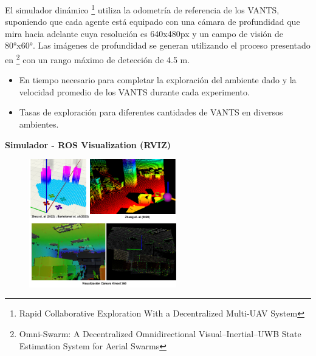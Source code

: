 \documentclass[
  24pt, %
  aspectratio=169, %
]{beamer}
\begin{document}
\begin{frame}
  El simulador dinámico \cite{RACER2022} \footnote{Rapid Collaborative Exploration With a Decentralized Multi-UAV System} utiliza la odometría de referencia de los VANTS, suponiendo que cada agente está equipado con una cámara de profundidad que mira hacia adelante cuya resolución es 640x480px y un campo de visión de 80°x60°. Las imágenes de profundidad se generan utilizando el proceso presentado en \cite{OMNI2022} \footnote{Omni-Swarm: A Decentralized Omnidirectional Visual–Inertial–UWB State Estimation System for Aerial Swarms} con un rango máximo de detección de 4.5 m.
  \bigskip %
  \begin{itemize}
  \item En tiempo necesario para completar la exploración del ambiente dado y la velocidad promedio de los VANTS durante cada experimento.
  \item Tasas de exploración para diferentes cantidades de VANTS en diversos ambientes.
  \end{itemize}
\end{frame}

\begin{frame}
  \textbf{Simulador -  ROS Visualization (RVIZ)}
  \begin{figure}
    \centering
    \includegraphics[width=0.57\textwidth]{visual}
  \end{figure}
\end{frame}
\end{document}
